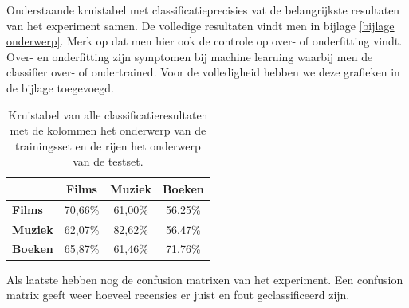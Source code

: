 Onderstaande kruistabel met classificatieprecisies vat de belangrijkste resultaten van het experiment samen. De volledige resultaten vindt men in bijlage \ref{bijlage onderwerp}. Merk op dat men hier ook de controle op over- of onderfitting vindt. Over- en onderfitting zijn symptomen bij machine learning waarbij men de classifier over- of ondertrained. Voor de volledigheid hebben we deze grafieken in de bijlage toegevoegd.    

\begin{table}[h]
\centering
\begin{tabular}{l|c|c|c|}
\cline{2-4}
                                      & \textbf{Films} & \textbf{Muziek} & \textbf{Boeken} \\ \hline
\multicolumn{1}{|l|}{\textbf{Films}} & 70,66\%         & 61,00\%         & 56,25\%         \\ \hline
\multicolumn{1}{|l|}{\textbf{Muziek}} & 62,07\%         & 82,62\%         & 56,47\%         \\ \hline
\multicolumn{1}{|l|}{\textbf{Boeken}} & 65,87\%         & 61,46\%         & 71,76\%         \\ \hline
\end{tabular}
\label{tab:alles}
\caption{Kruistabel van alle classificatieresultaten met de kolommen het onderwerp van de trainingsset en de rijen het onderwerp van de testset.} 
\end{table}

Als laatste hebben nog de confusion matrixen van het experiment. Een confusion matrix geeft weer hoeveel recensies er juist en fout geclassificeerd zijn. 

